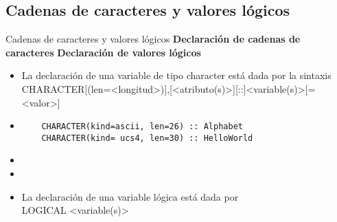 
\subsection{Cadenas de caracteres y valores lógicos}

\begin{frame}[fragile]{Cadenas de caracteres y valores lógicos}
\textbf{Declaración de cadenas de caracteres}
\textbf{Declaración de valores lógicos}
 \begin{itemize}[<+(0)->]
  \item La declaración de una variable de tipo character está dada por la sintaxis\\ 
   \centering CHARACTER[(len=<longitud>)],[<atributo(s)>][::]<variable(s)>[=<valor>]
  \vspace{6pt}
  \item []
   \begin{verbatim}
    CHARACTER(kind=ascii, len=26) :: Alphabet
    CHARACTER(kind= ucs4, len=30) :: HelloWorld
   \end{verbatim}
  \item[] 
  \item \item La declaración de una variable lógica está dada por\\ 
   \centering LOGICAL <variable(s)>
 \end{itemize}
\end{frame}

